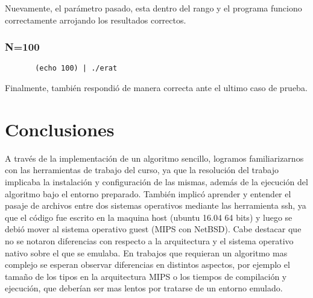 \documentclass[a4paper,10pt]{article}
\begin{document}
    Nuevamente, el parámetro pasado, esta dentro del rango y el programa funciono correctamente arrojando los resultados correctos.
    
   \subsubsection{N=100}
    \begin{verbatim}
       (echo 100) | ./erat 
    \end{verbatim}

    Finalmente, también respondió de manera correcta ante el ultimo caso de prueba.
    
\section{Conclusiones}

    A través de la implementación de un algoritmo sencillo, logramos familiarizarnos con las herramientas de trabajo del curso, ya que la resolución del trabajo implicaba la instalación y configuración de las mismas, además de la ejecución del algoritmo bajo el entorno preparado. También implicó aprender y entender el pasaje de archivos entre dos sistemas operativos mediante las herramienta ssh, ya que el código fue escrito en la maquina host (ubuntu 16.04 64 bits) y luego se debió mover al sistema operativo guest (MIPS con NetBSD). Cabe destacar que no se notaron diferencias con respecto a la arquitectura y el sistema operativo nativo sobre el que se emulaba. En trabajos que requieran un algoritmo mas complejo se esperan observar diferencias en distintos aspectos, por ejemplo el tamaño de los tipos en la arquitectura MIPS o los tiempos de compilación y ejecución, que deberían ser mas lentos por tratarse de un entorno emulado.
\end{document}
